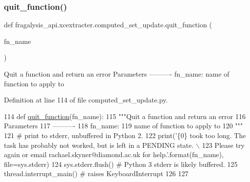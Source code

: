 \subsubsection{\texorpdfstring{quit\+\_\+function()}{quit\_function()}}
{\footnotesize\ttfamily def fragalysis\+\_\+api.\+xcextracter.\+computed\+\_\+set\+\_\+update.\+quit\+\_\+function (\begin{DoxyParamCaption}\item[{}]{fn\+\_\+name }\end{DoxyParamCaption})}

\begin{DoxyVerb}Quit a function and return an error
Parameters
----------
fn_name:
    name of function to apply to
\end{DoxyVerb}
 

Definition at line 114 of file computed\+\_\+set\+\_\+update.\+py.


\begin{DoxyCode}
114 \textcolor{keyword}{def }\hyperlink{namespacefragalysis__api_1_1xcextracter_1_1computed__set__update_a9a7a1666e3c737a48bc3ebfe981adeef}{quit\_function}(fn\_name):
115     \textcolor{stringliteral}{"""Quit a function and return an error}
116 \textcolor{stringliteral}{    Parameters}
117 \textcolor{stringliteral}{    ----------}
118 \textcolor{stringliteral}{    fn\_name:}
119 \textcolor{stringliteral}{        name of function to apply to}
120 \textcolor{stringliteral}{    """}
121     \textcolor{comment}{# print to stderr, unbuffered in Python 2.}
122     print(\textcolor{stringliteral}{'\{0\} took too long. The task has probably not worked, but is left in a PENDING state. \(\backslash\)}
123 \textcolor{stringliteral}{    Please try again or email rachael.skyner@diamond.ac.uk for help.'}.format(fn\_name), file=sys.stderr)
124     sys.stderr.flush() \textcolor{comment}{# Python 3 stderr is likely buffered.}
125     thread.interrupt\_main() \textcolor{comment}{# raises KeyboardInterrupt}
126     
127 
\end{DoxyCode}
\mbox{\label{namespacefragalysis__api_1_1xcextracter_1_1computed__set__update_a3fd757f4575c325be0c0288fa1f0738d}} 
